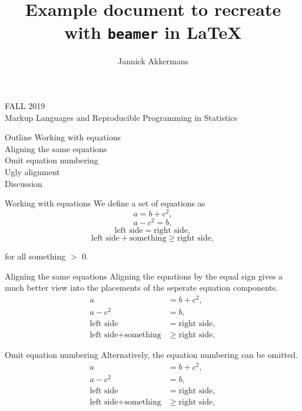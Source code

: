 \documentclass[aspectratio=169]{beamer}
\title{Example document to recreate with \texttt{beamer} in \LaTeX}
\author{Jannick Akkermans}
\begin{document}
\begin{frame}[plain]
  \titlepage
  \vfill
  \begin{center}
  FALL 2019\\
  Markup Languages and Reproducible Programming in Statistics
  \end{center}
\end{frame}


\begin{frame}{Outline}
Working with equations\\
\hspace{4mm} Aligning the same equations\\
\hspace{4mm} Omit equation numbering\\
\hspace{4mm} Ugly alignment\\

\vspace{10mm}
Discussion
\end{frame}

\begin{frame}{Working with equations}
We define a set of equations as
\begin{equation}
  a = b + c^2,
\end{equation}
\begin{equation}
  a - c^2 = b,
\end{equation}
\begin{equation}
  \text{left side} = \text{right side},
\end{equation}
\begin{equation}
  \text{left side} + \text{something} \geq \text{right side},
\end{equation}

for all something $>$ 0.
\end{frame}

\begin{frame}{Aligning the same equations}
Aligning the equations by the equal sign gives a much better view into the placements of the seperate equation components.
\begin{align}
a &= b + c^2,\\
a - c^2 &= b,\\
\text{left side} &= \text{right side},\\
\text{left side} + \text{something} & \geq \text{right side},
\end{align}
\end{frame}

\begin{frame}{Omit equation numbering}
Alternatively, the equation numbering can be omitted.
\begin{align*}
a &= b + c^2,\\
a - c^2 &= b,\\
\text{left side} &= \text{right side},\\
\text{left side} + \text{something} & \geq \text{right side},
\end{align*}
\end{frame}
\end{document}
